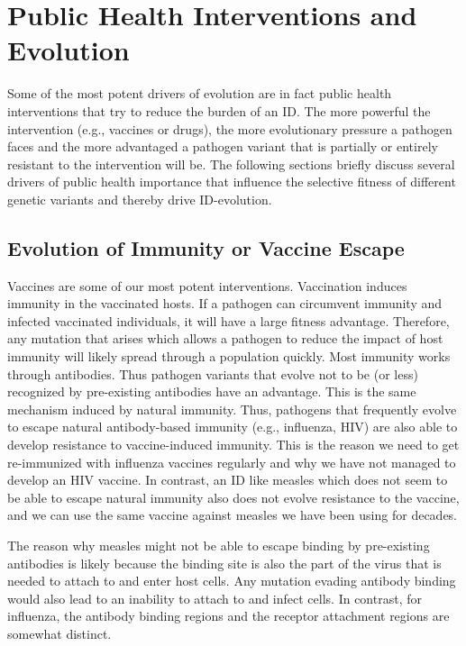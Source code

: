 \documentclass[]{book}
\theoremstyle{definition}
\theoremstyle{definition}
\theoremstyle{definition}
\theoremstyle{remark}
\begin{document}
\section{Public Health Interventions and
Evolution}\label{public-health-interventions-and-evolution}

Some of the most potent drivers of evolution are in fact public health
interventions that try to reduce the burden of an ID. The more powerful
the intervention (e.g., vaccines or drugs), the more evolutionary
pressure a pathogen faces and the more advantaged a pathogen variant
that is partially or entirely resistant to the intervention will be. The
following sections briefly discuss several drivers of public health
importance that influence the selective fitness of different genetic
variants and thereby drive ID-evolution.

\subsection{Evolution of Immunity or Vaccine
Escape}\label{evolution-of-immunity-or-vaccine-escape}

Vaccines are some of our most potent interventions. Vaccination induces
immunity in the vaccinated hosts. If a pathogen can circumvent immunity
and infected vaccinated individuals, it will have a large fitness
advantage. Therefore, any mutation that arises which allows a pathogen
to reduce the impact of host immunity will likely spread through a
population quickly. Most immunity works through antibodies. Thus
pathogen variants that evolve not to be (or less) recognized by
pre-existing antibodies have an advantage. This is the same mechanism
induced by natural immunity. Thus, pathogens that frequently evolve to
escape natural antibody-based immunity (e.g., influenza, HIV) are also
able to develop resistance to vaccine-induced immunity. This is the
reason we need to get re-immunized with influenza vaccines regularly and
why we have not managed to develop an HIV vaccine. In contrast, an ID
like measles which does not seem to be able to escape natural immunity
also does not evolve resistance to the vaccine, and we can use the same
vaccine against measles we have been using for decades.

The reason why measles might not be able to escape binding by
pre-existing antibodies is likely because the binding site is also the
part of the virus that is needed to attach to and enter host cells. Any
mutation evading antibody binding would also lead to an inability to
attach to and infect cells. In contrast, for influenza, the antibody
binding regions and the receptor attachment regions are somewhat
distinct.
\end{document}

